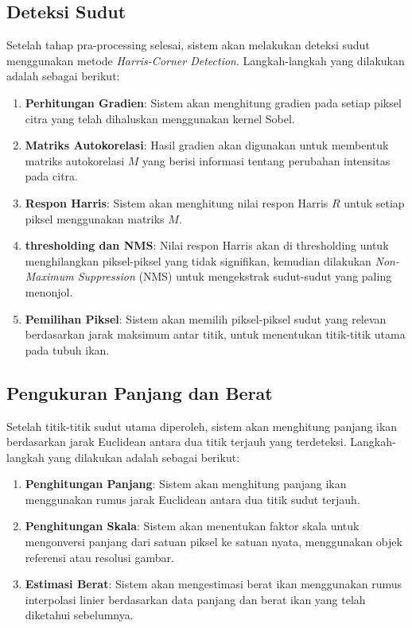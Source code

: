 \subsection{Deteksi Sudut}
    Setelah tahap pra-processing selesai, sistem akan melakukan deteksi sudut menggunakan metode \emph{Harris-Corner Detection}. Langkah-langkah yang dilakukan adalah sebagai berikut: 
    \begin{enumerate}
            \item \textbf{Perhitungan Gradien}: Sistem akan menghitung gradien pada setiap piksel citra yang telah dihaluskan menggunakan kernel Sobel.
            \item \textbf{Matriks Autokorelasi}: Hasil gradien akan digunakan untuk membentuk matriks autokorelasi \(M\) yang berisi informasi tentang perubahan intensitas pada citra.
            \item \textbf{Respon Harris}: Sistem akan menghitung nilai respon Harris \(R\) untuk setiap piksel menggunakan matriks \(M\).
            \item \textbf{thresholding dan NMS}: Nilai respon Harris akan di thresholding untuk menghilangkan piksel-piksel yang tidak signifikan, kemudian dilakukan \emph{Non-Maximum Suppression} (NMS) untuk mengekstrak sudut-sudut yang paling menonjol.
            \item \textbf{Pemilihan Piksel}: Sistem akan memilih piksel-piksel sudut yang relevan berdasarkan jarak maksimum antar titik, untuk menentukan titik-titik utama pada tubuh ikan.
        \end{enumerate}

\subsection{Pengukuran Panjang dan Berat}
    Setelah titik-titik sudut utama diperoleh, sistem akan menghitung panjang ikan berdasarkan jarak Euclidean antara dua titik terjauh yang terdeteksi. Langkah-langkah yang dilakukan adalah sebagai berikut:
\begin{enumerate}
    \item \textbf{Penghitungan Panjang}: Sistem akan menghitung panjang ikan menggunakan rumus jarak Euclidean antara dua titik sudut terjauh.
    \item \textbf{Penghitungan Skala}: Sistem akan menentukan faktor skala untuk mengonversi panjang dari satuan piksel ke satuan nyata, menggunakan objek referensi atau resolusi gambar.
    \item \textbf{Estimasi Berat}: Sistem akan mengestimasi berat ikan menggunakan rumus interpolasi linier berdasarkan data panjang dan berat ikan yang telah diketahui sebelumnya.
\end{enumerate}

